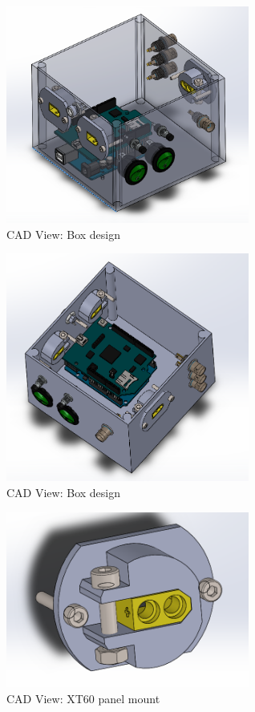 \documentclass[a4paper]{article}
\begin{document}
\begin{figure}[h!]
    \centering
    \includegraphics[width = 8cm]{images/CADBox1.png}
    \caption{CAD View: Box design}
    \label{fig:CAD1}
\end{figure}


\begin{figure}[h!]
    \centering
    \includegraphics[width = 8cm]{images/CADBox2.png}
    \caption{CAD View: Box design}
    \label{fig:CAD2}
\end{figure}

\begin{figure}[h!]
    \centering
    \includegraphics[width = 8cm]{images/xt60Mount.png}
    \caption{CAD View: XT60 panel mount}
    \label{fig:xt60Panel}
\end{figure}
\end{document}
